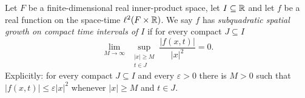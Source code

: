 \begin{definition}
Let $F$ be a finite-dimensional real inner-product space, let $I\subseteq\mathbb{R}$ and
let $f$ be a real function on the space-time $\ell^2(F\times\mathbb{R})$. We say $f$ has
\emph{subquadratic spatial growth on compact time intervals of $I$} if for every
compact $J\subseteq I$
\[
  \lim_{M\to\infty}\ \sup_{\substack{|x|\ge M\\ t\in J}}
      \frac{|f(x,t)|}{|x|^2}=0 .
\]
Explicitly: for every compact $J\subseteq I$ and every $\varepsilon>0$ there is
$M>0$ such that $|f(x,t)|\le\varepsilon|x|^2$ whenever $|x|\ge M$ and $t\in J$.
\end{definition}
